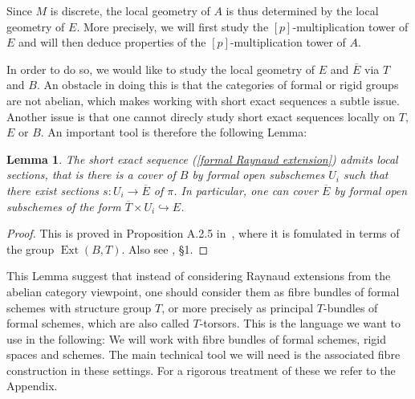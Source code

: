 \documentclass[10pt,oneside]{amsart}
\newtheorem{lemma}[theorem]{Lemma}
\theoremstyle{definition}
\theoremstyle{remark}
\begin{document}
	Since $M$ is discrete, the local geometry of $A$ is thus determined by the local geometry of $E$. More precisely, we will first study the $[p]$-multiplication tower of $E$ and will then deduce properties of the $[p]$-multiplication tower of $A$.
	
	In order to do so, we would like to study the local geometry of $E$ and $\overline{E}$ via $T$ and $B$. An obstacle in doing this is that the categories of formal or rigid groups are not abelian, which makes working with short exact sequences a subtle issue. Another issue is that one cannot direcly study short exact sequences locally on $T$, $E$ or $B$. An important tool is therefore the following Lemma:

	\begin{lemma}\label{formal Raynaud sequence is locally split}
		The short exact sequence (\ref{formal Raynaud extension}) admits local sections, that is there is a cover of $B$ by formal open subschemes $U_i$ such that there exist sections $s:U_i\rightarrow \overline{E}$ of $\pi$. In particular, one can cover $\overline{E}$ by formal open subschemes of the form $\overline{T}\times U_i\hookrightarrow E$.
	\end{lemma}
	\begin{proof}
		This is proved in Proposition A.2.5 in~\cite{rigid geometry of curves}, where it is fomulated in terms of the group $\operatorname{Ext}(B,T)$. Also see \cite{BL}, \S 1.
	\end{proof}
	
	This Lemma suggest that instead of considering Raynaud extensions from the abelian category viewpoint, one should consider them as fibre bundles of formal schemes with structure group $T$, or more precisely as principal $T$-bundles of formal schemes, which are also called $T$-torsors. This is the language we want to use in the following: We will work with fibre bundles of formal schemes, rigid spaces and schemes. The main technical tool we will need is the associated fibre construction in these settings. For a rigorous  treatment of these we refer to the Appendix.
	
\end{document}
